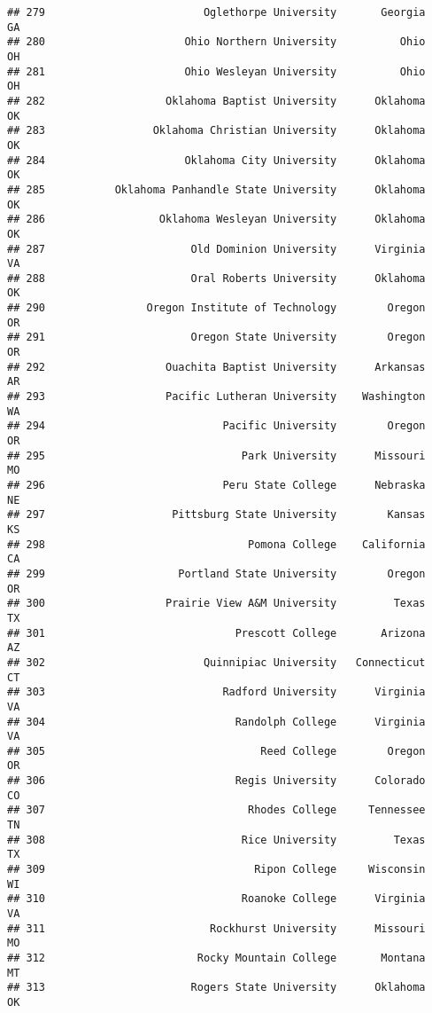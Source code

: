 \documentclass[
]{article}
\begin{document}
\begin{verbatim}
## 279                         Oglethorpe University       Georgia         GA
## 280                      Ohio Northern University          Ohio         OH
## 281                      Ohio Wesleyan University          Ohio         OH
## 282                   Oklahoma Baptist University      Oklahoma         OK
## 283                 Oklahoma Christian University      Oklahoma         OK
## 284                      Oklahoma City University      Oklahoma         OK
## 285           Oklahoma Panhandle State University      Oklahoma         OK
## 286                  Oklahoma Wesleyan University      Oklahoma         OK
## 287                       Old Dominion University      Virginia         VA
## 288                       Oral Roberts University      Oklahoma         OK
## 290                Oregon Institute of Technology        Oregon         OR
## 291                       Oregon State University        Oregon         OR
## 292                   Ouachita Baptist University      Arkansas         AR
## 293                   Pacific Lutheran University    Washington         WA
## 294                            Pacific University        Oregon         OR
## 295                               Park University      Missouri         MO
## 296                            Peru State College      Nebraska         NE
## 297                    Pittsburg State University        Kansas         KS
## 298                                Pomona College    California         CA
## 299                     Portland State University        Oregon         OR
## 300                   Prairie View A&M University         Texas         TX
## 301                              Prescott College       Arizona         AZ
## 302                         Quinnipiac University   Connecticut         CT
## 303                            Radford University      Virginia         VA
## 304                              Randolph College      Virginia         VA
## 305                                  Reed College        Oregon         OR
## 306                              Regis University      Colorado         CO
## 307                                Rhodes College     Tennessee         TN
## 308                               Rice University         Texas         TX
## 309                                 Ripon College     Wisconsin         WI
## 310                               Roanoke College      Virginia         VA
## 311                          Rockhurst University      Missouri         MO
## 312                        Rocky Mountain College       Montana         MT
## 313                       Rogers State University      Oklahoma         OK

\end{verbatim}
\end{document}
